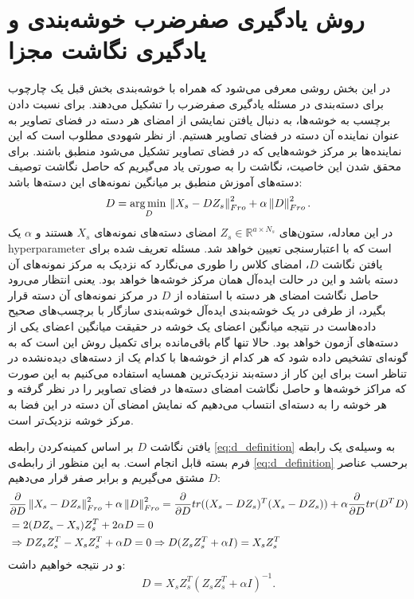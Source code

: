 \section{روش یادگیری صفرضرب خوشه‌بندی و یادگیری نگاشت مجزا} \label{simple_method}
در این بخش روشی معرفی می‌شود که همراه با خوشه‌بندی بخش قبل یک چارچوب برای دسته‌بندی در مسئله یادگیری صفرضرب را تشکیل می‌دهند. برای نسبت دادن برچسب به خوشه‌ها، به دنبال یافتن نمایشی از امضای هر دسته در فضای تصاویر به عنوان نماینده آن دسته در فضای تصاویر هستیم. از نظر شهودی مطلوب است که این نماینده‌ها بر مرکز خوشه‌هایی که در فضای تصاویر تشکیل می‌شود منطبق باشند. برای محقق شدن این خاصیت، نگاشت را به صورتی یاد می‌گیریم که حاصل نگاشت توصیف دسته‌های آموزش منطبق بر میانگین نمونه‌های این دسته‌ها باشد:
\begin{equation} \label{eq:d_definition}
  D = \operatorname*{arg\,min\,}_D \left \lVert X_s - D Z_s \right \rVert_{Fro}^2 + \alpha \left \lVert D \right \rVert_{Fro}^2.
\end{equation}
در این معادله، ستون‌های
 $Z_s \in \mathbb{R}^{a \times N_s}$
  امضای دسته‌های نمونه‌های $X_s$ هستند و $\alpha$ یک \gls{hyperparameter} است که با اعتبارسنجی تعیین خواهد شد. مسئله تعریف شده برای یافتن نگاشت $D$، امضای کلاس را طوری می‌نگارد که نزدیک به مرکز نمونه‌های آن دسته باشد و این در حالت ایده‌آل همان مرکز خوشه‌ها خواهد بود. یعنی انتظار می‌رود
  حاصل نگاشت امضای هر دسته با استفاده از $D$ در مرکز نمونه‌های آن دسته قرار بگیرد، از طرفی در یک خوشه‌بندی ایده‌آل خوشه‌بندی سازگار با برچسب‌های صحیح داده‌هاست در نتیجه میانگین اعضای یک خوشه در حقیقت میانگین اعضای یکی از دسته‌های آزمون خواهد بود. حالا تنها گام باقی‌مانده برای تکمیل روش این است که به گونه‌ای تشخیص داده شود که هر کدام از خوشه‌ها با کدام یک از دسته‌های دیده‌نشده در تناظر است برای این کار از دسته‌بند نزدیک‌ترین همسایه استفاده می‌کنیم به این صورت که مراکز خوشه‌ها و حاصل نگاشت امضای دسته‌ها در فضای تصاویر را در نظر گرفته و هر خوشه را به دسته‌ای انتساب می‌دهیم که نمایش  امضای آن دسته در این فضا به مرکز خوشه نزدیک‌تر است.

یافتن نگاشت $D$ بر اساس  کمینه‌کردن رابطه
  \eqref{eq:d_definition}
  به وسیله‌ی یک رابطه فرم بسته قابل انجام است.
  به این منظور از رابطه‌ی \eqref{eq:d_definition} برحسب عناصر $D$ مشتق می‌گیریم و برابر صفر قرار می‌دهیم:
  \begin{align*}
  &\frac{\partial}{\partial D} \left \lVert X_s - D Z_s \right \rVert_{Fro}^2 + \alpha \left \lVert D \right \rVert_{Fro}^2 =
    \frac{\partial} {\partial D}tr((X_s -DZ_s)^T (X_s-DZ_s)) + \alpha \frac{\partial}{\partial D}tr(D^TD) \\
& = 2(DZ_s - X_s)Z_s^T + 2 \alpha D =0 \\
&\Rightarrow  DZ_sZ_s^T -  X_sZ_s^T + \alpha D =0 \Rightarrow D(Z_sZ_s^T + \alpha I) =  X_sZ_s^T
  \end{align*}
  و در نتیجه خواهیم داشت:
  \begin{equation} \label{eq:d_answer}
  D = X_s Z_s^T (Z_s Z_s^T + \alpha I)^{-1}.
\end{equation}


